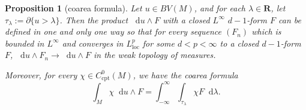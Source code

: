\documentclass[reqno,11pt]{amsart}
\newcommand{\RR}{\mathbf{R}}
\newcommand*\dif{\mathop{}\!\mathrm{d}}
\newcommand{\loc}{\mathrm{loc}}
\newcommand{\cpt}{\mathrm{cpt}}
\newtheorem{proposition}[theorem]{Proposition}
\theoremstyle{definition}
\numberwithin{equation}{section}
\begin{document}
\begin{proposition}[coarea formula]
Let $u \in BV(M)$, and for each $\lambda \in \RR$, let $\tau_\lambda := \partial \{u > \lambda\}$.
Then the product $\dif u \wedge F$ with a closed $L^\infty$ $d - 1$-form $F$ can be defined in one and only one way so that for every sequence $(F_n)$ which is bounded in $L^\infty$ and converges in $L^p_\loc$ for some $d < p < \infty$ to a closed $d - 1$-form $F$, $\dif u \wedge F_n \to \dif u \wedge F$ in the weak topology of measures.

Moreover, for every $\chi \in C^0_\cpt(M)$, we have the coarea formula
\begin{equation}\label{coarea formula}
\int_M \chi \dif u \wedge F = \int_{-\infty}^\infty \int_{\tau_\lambda} \chi F \dif \lambda.
\end{equation}
\end{proposition}
\end{document}
